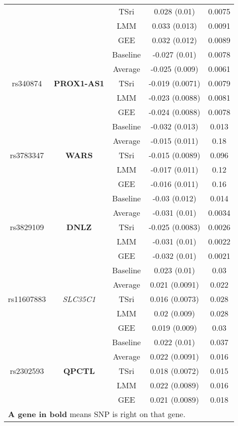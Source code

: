 \begin{table}[ht]
{\begin{tabular}{ccccc}
   &  & TSri & 0.028 (0.01) & 0.0075 \\ 
   &  & LMM & 0.033 (0.013) & 0.0091 \\ 
   &  & GEE & 0.032 (0.012) & 0.0089 \\ 
   \hline
\multirow{5}{*}{rs340874} & \multirow{5}{*}{\textbf{PROX1-AS1}} & Baseline & -0.027 (0.01) & 0.0078 \\ 
   &  & Average & -0.025 (0.009) & 0.0061 \\ 
   &  & TSri & -0.019 (0.0071) & 0.0079 \\ 
   &  & LMM & -0.023 (0.0088) & 0.0081 \\ 
   &  & GEE & -0.024 (0.0088) & 0.0078 \\ 
   \hline
\multirow{5}{*}{rs3783347} & \multirow{5}{*}{\textbf{WARS}} & Baseline & -0.032 (0.013) & 0.013 \\ 
   &  & Average & -0.015 (0.011) & 0.18 \\ 
   &  & TSri & -0.015 (0.0089) & 0.096 \\ 
   &  & LMM & -0.017 (0.011) & 0.12 \\ 
   &  & GEE & -0.016 (0.011) & 0.16 \\ 
   \hline
\multirow{5}{*}{rs3829109} & \multirow{5}{*}{\textbf{DNLZ}} & Baseline & -0.03 (0.012) & 0.014 \\ 
   &  & Average & -0.031 (0.01) & 0.0034 \\ 
   &  & TSri & -0.025 (0.0083) & 0.0026 \\ 
   &  & LMM & -0.031 (0.01) & 0.0022 \\ 
   &  & GEE & -0.032 (0.01) & 0.0021 \\ 
   \hline
\multirow{5}{*}{rs11607883} & \multirow{5}{*}{\textit{SLC35C1}} & Baseline & 0.023 (0.01) & 0.03 \\ 
   &  & Average & 0.021 (0.0091) & 0.022 \\ 
   &  & TSri & 0.016 (0.0073) & 0.028 \\ 
   &  & LMM & 0.02 (0.009) & 0.028 \\ 
   &  & GEE & 0.019 (0.009) & 0.03 \\ 
   \hline
\multirow{5}{*}{rs2302593} & \multirow{5}{*}{\textbf{QPCTL}} & Baseline & 0.022 (0.01) & 0.037 \\ 
   &  & Average & 0.022 (0.0091) & 0.016 \\ 
   &  & TSri & 0.018 (0.0072) & 0.015 \\ 
   &  & LMM & 0.022 (0.0089) & 0.016 \\ 
   &  & GEE & 0.021 (0.0089) & 0.018 \\ 
   \hline
\multicolumn{5}{l}{\footnotesize*\textbf{A gene in bold} means SNP is right on that gene.}
\end{tabular}
}
\end{table}
